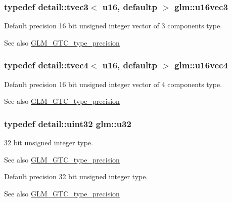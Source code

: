\subsubsection[{\texorpdfstring{u16vec3}{u16vec3}}]{\setlength{\rightskip}{0pt plus 5cm}typedef detail\+::tvec3$<$ u16, defaultp $>$ {\bf glm\+::u16vec3}}\hypertarget{group__gtc__type__precision_ga372e1184da616b77fcbd48b8c166c24a}{}\label{group__gtc__type__precision_ga372e1184da616b77fcbd48b8c166c24a}
Default precision 16 bit unsigned integer vector of 3 components type. \begin{DoxySeeAlso}{See also}
\hyperlink{group__gtc__type__precision}{G\+L\+M\+\_\+\+G\+T\+C\+\_\+type\+\_\+precision} 
\end{DoxySeeAlso}
\subsubsection[{\texorpdfstring{u16vec4}{u16vec4}}]{\setlength{\rightskip}{0pt plus 5cm}typedef detail\+::tvec4$<$ u16, defaultp $>$ {\bf glm\+::u16vec4}}\hypertarget{group__gtc__type__precision_gaac02cce8820bcdbbeea9659aeaa718fb}{}\label{group__gtc__type__precision_gaac02cce8820bcdbbeea9659aeaa718fb}
Default precision 16 bit unsigned integer vector of 4 components type. \begin{DoxySeeAlso}{See also}
\hyperlink{group__gtc__type__precision}{G\+L\+M\+\_\+\+G\+T\+C\+\_\+type\+\_\+precision} 
\end{DoxySeeAlso}
\subsubsection[{\texorpdfstring{u32}{u32}}]{\setlength{\rightskip}{0pt plus 5cm}typedef detail\+::uint32 {\bf glm\+::u32}}\hypertarget{group__gtc__type__precision_ga54e837745059fd29017bed71cfa0a8db}{}\label{group__gtc__type__precision_ga54e837745059fd29017bed71cfa0a8db}
32 bit unsigned integer type. \begin{DoxySeeAlso}{See also}
\hyperlink{group__gtc__type__precision}{G\+L\+M\+\_\+\+G\+T\+C\+\_\+type\+\_\+precision}
\end{DoxySeeAlso}
Default precision 32 bit unsigned integer type. \begin{DoxySeeAlso}{See also}
\hyperlink{group__gtc__type__precision}{G\+L\+M\+\_\+\+G\+T\+C\+\_\+type\+\_\+precision} 
\end{DoxySeeAlso}
